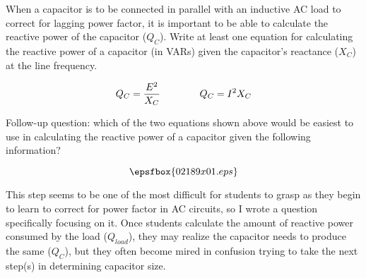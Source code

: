 

When a capacitor is to be connected in parallel with an inductive AC load to correct for lagging power factor, it is important to be able to calculate the reactive power of the capacitor ($Q_C$).  Write at least one equation for calculating the reactive power of a capacitor (in VARs) given the capacitor's reactance ($X_C$) at the line frequency.







$$Q_C = {E^2 \over X_C} \hbox{\hskip 40pt} Q_C = I^2 X_C$$

\vskip 10pt

Follow-up question: which of the two equations shown above would be easiest to use in calculating the reactive power of a capacitor given the following information?

$$\epsfbox{02189x01.eps}$$







This step seems to be one of the most difficult for students to grasp as they begin to learn to correct for power factor in AC circuits, so I wrote a question specifically focusing on it.  Once students calculate the amount of reactive power consumed by the load ($Q_{load}$), they may realize the capacitor needs to produce the same ($Q_C$), but they often become mired in confusion trying to take the next step(s) in determining capacitor size.




